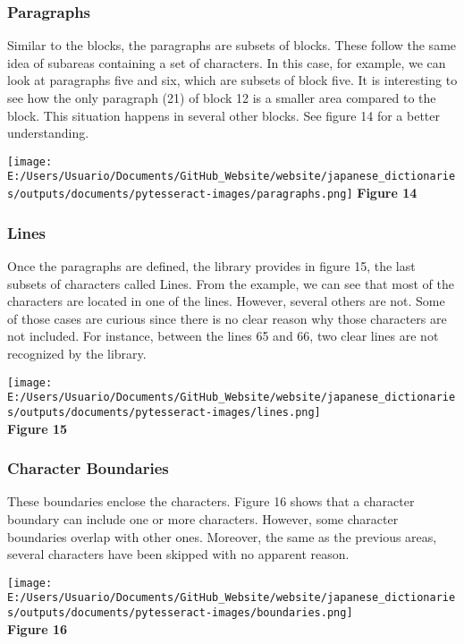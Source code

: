\documentclass[
]{article}
\begin{document}
\hypertarget{paragraphs}{%
\subsubsection{Paragraphs}\label{paragraphs}}

Similar to the blocks, the paragraphs are subsets of blocks. These
follow the same idea of subareas containing a set of characters. In this
case, for example, we can look at paragraphs five and six, which are
subsets of block five. It is interesting to see how the only paragraph
(21) of block 12 is a smaller area compared to the block. This situation
happens in several other blocks. See figure 14 for a better
understanding.

\texttt{[image: E:/Users/Usuario/Documents/GitHub\_Website/website/japanese\_dictionaries/outputs/documents/pytesseract-images/paragraphs.png]}
\textbf{Figure 14}

\hypertarget{lines-1}{%
\subsubsection{Lines}\label{lines-1}}

Once the paragraphs are defined, the library provides in figure 15, the
last subsets of characters called Lines. From the example, we can see
that most of the characters are located in one of the lines. However,
several others are not. Some of those cases are curious since there is
no clear reason why those characters are not included. For instance,
between the lines 65 and 66, two clear lines are not recognized by the
library.

\texttt{[image: E:/Users/Usuario/Documents/GitHub\_Website/website/japanese\_dictionaries/outputs/documents/pytesseract-images/lines.png]}\\
\textbf{Figure 15}

\hypertarget{character-boundaries}{%
\subsubsection{Character Boundaries}\label{character-boundaries}}

These boundaries enclose the characters. Figure 16 shows that a
character boundary can include one or more characters. However, some
character boundaries overlap with other ones. Moreover, the same as the
previous areas, several characters have been skipped with no apparent
reason.

\texttt{[image: E:/Users/Usuario/Documents/GitHub\_Website/website/japanese\_dictionaries/outputs/documents/pytesseract-images/boundaries.png]}\\
\textbf{Figure 16}
\end{document}
